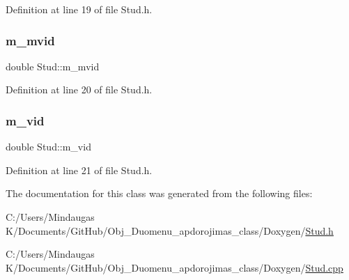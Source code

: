 Definition at line 19 of file Stud.\+h.

\mbox{\label{class_stud_a33421b12df3d9995f0e59f7ac21b262e}} 
\subsubsection{\texorpdfstring{m\_mvid}{m\_mvid}}
{\footnotesize\ttfamily double Stud\+::m\+\_\+mvid\hspace{0.3cm}{\ttfamily [private]}}



Definition at line 20 of file Stud.\+h.

\mbox{\label{class_stud_af5365d950f39faf16533a67eeebb4c7a}} 
\subsubsection{\texorpdfstring{m\_vid}{m\_vid}}
{\footnotesize\ttfamily double Stud\+::m\+\_\+vid\hspace{0.3cm}{\ttfamily [private]}}



Definition at line 21 of file Stud.\+h.



The documentation for this class was generated from the following files\+:\begin{DoxyCompactItemize}
\item 
C\+:/\+Users/\+Mindaugas K/\+Documents/\+Git\+Hub/\+Obj\+\_\+\+Duomenu\+\_\+apdorojimas\+\_\+class/\+Doxygen/\mbox{\hyperlink{_stud_8h}{Stud.\+h}}\item 
C\+:/\+Users/\+Mindaugas K/\+Documents/\+Git\+Hub/\+Obj\+\_\+\+Duomenu\+\_\+apdorojimas\+\_\+class/\+Doxygen/\mbox{\hyperlink{_stud_8cpp}{Stud.\+cpp}}\end{DoxyCompactItemize}
